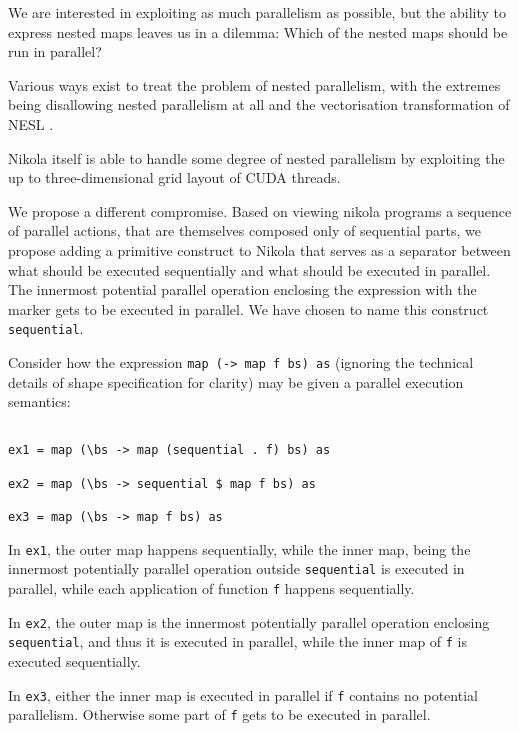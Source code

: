 \label{chap:directing-parallism}

We are interested in exploiting as much parallelism as possible, but the
ability to express nested maps leaves us in a dilemma: Which of the nested maps
should be run in parallel?

Various ways exist to treat the problem of nested parallelism, with the
extremes being disallowing nested parallelism at all and the vectorisation
transformation of NESL \cite{nesl}.

Nikola itself is able to handle some degree of nested parallelism by exploiting
the up to three-dimensional grid layout of CUDA threads.

We propose a different compromise. Based on viewing nikola programs a sequence
of parallel actions, that are themselves composed only of sequential parts, we
propose adding a primitive construct to Nikola that serves as a separator
between what should be executed sequentially and what should be executed in
parallel. The innermost potential parallel operation enclosing the expression
with the marker gets to be executed in parallel. We have chosen to name this
construct \texttt{sequential}.

Consider how the expression \texttt{map (\bs -> map f bs) as} (ignoring the
technical details of shape specification for clarity) may be given a parallel
execution semantics:

\begin{verbatim}

ex1 = map (\bs -> map (sequential . f) bs) as

ex2 = map (\bs -> sequential $ map f bs) as

ex3 = map (\bs -> map f bs) as

\end{verbatim}

In \texttt{ex1}, the outer map happens sequentially, while the inner map, being
the innermost potentially parallel operation outside \texttt{sequential} is
executed in parallel, while each application of function \texttt{f} happens
sequentially.

In \texttt{ex2}, the outer map is the innermost potentially parallel operation
enclosing \texttt{sequential}, and thus it is executed in parallel, while the
inner map of \texttt{f} is executed sequentially.

In \texttt{ex3}, either the inner map is executed in parallel if \texttt{f}
contains no potential parallelism. Otherwise some part of \texttt{f} gets to be
executed in parallel.

